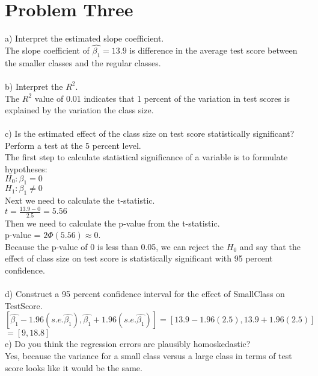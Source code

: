 \documentclass[11pt, oneside]{article}   	%
\begin{document}
\section{Problem Three}
a) Interpret the estimated slope coefficient.\\
The slope coefficient of $\hat{\beta_1} = 13.9$ is difference in the average test score between the smaller classes and the regular classes.\\~\\
b) Interpret the $R^2$.\\
The $R^2$ value of 0.01 indicates that 1 percent of the variation in test scores is explained by the variation the class size. \\~\\
c) Is the estimated effect of the class size on test score statistically significant? Perform a test at the 5 percent level.\\
The first step to calculate statistical significance of a variable is to formulate hypotheses:\\
$H_0: \beta_1 = 0$\\
$H_1: \beta_1 \neq 0$\\
Next we need to calculate the t-statistic.\\
$t = \frac{13.9 - 0}{2.5} = 5.56$\\
Then we need to calculate the p-value from the t-statistic.\\
p-value = $2\Phi(5.56) \approx 0$.\\
Because the p-value of 0 is less than 0.05, we can reject the $H_0$ and say that the effect of class size on test score is statistically significant with 95 percent confidence.\\~\\
d) Construct a 95 percent confidence interval for the effect of SmallClass on TestScore.\\
$[\hat{\beta_1} - 1.96(s.e. \hat{\beta_1}), \hat{\beta_1} + 1.96(s.e. \hat{\beta_1})] = [13.9 - 1.96(2.5), 13.9+1.96(2.5)]$\\
$ = [9, 18.8]$\\
e) Do you think the regression errors are plausibly homoskedastic?\\
Yes, because the variance for a small class versus a large class in terms of test score looks like it would be the same.
\end{document}
